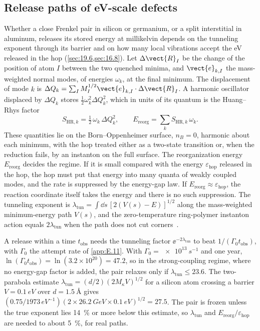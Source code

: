 \subsection{Release paths of eV-scale defects}

Whether a close Frenkel pair in silicon or germanium, or a split interstitial in aluminum, releases its stored energy at millikelvin depends on the tunneling exponent through its barrier and on how many local vibrations accept the eV released in the hop (\cref{sec:19.6,sec:16.8}). Let $\Delta\vect{R}_I$ be the change of the position of atom $I$ between the two quenched minima, and $\vect{e}_{k,I}$ the mass-weighted normal modes, of energies $\omega_k$, at the final minimum. The displacement of mode $k$ is $\Delta Q_k = \sum_I M_I^{1/2}\vect{e}_{k,I}\cdot\Delta\vect{R}_I$. A harmonic oscillator displaced by $\Delta Q_k$ stores $\tfrac12\omega_k^2\Delta Q_k^2$, which in units of its quantum is the Huang--Rhys factor~\cite{huang1950theory}
\begin{equation}
  S_{\mathrm{HR},k} = \tfrac12\,\omega_k\,\Delta Q_k^2 ,
  \qquad E_{\mathrm{reorg}} = \sum_k S_{\mathrm{HR},k}\,\omega_k .
  \label{eq:E.22-SHR}
\end{equation}
These quantities lie on the Born--Oppenheimer surface, $n_B = 0$, harmonic about each minimum, with the hop treated either as a two-state transition or, when the reduction fails, by an instanton on the full surface. The reorganization energy $E_{\mathrm{reorg}}$ decides the regime. If it is small compared with the energy $\varepsilon_{\mathrm{hop}}$ released in the hop, the hop must put that energy into many quanta of weakly coupled modes, and the rate is suppressed by the energy-gap law. If $E_{\mathrm{reorg}} \approx \varepsilon_{\mathrm{hop}}$, the reaction coordinate itself takes the energy and there is no such suppression. The tunneling exponent is $\lambda_{\mathrm{tun}} = \int\dd s\,[2(V(s) - E)]^{1/2}$ along the mass-weighted minimum-energy path $V(s)$, and the zero-temperature ring-polymer instanton action equals $2\lambda_{\mathrm{tun}}$ when the path does not cut corners~\cite{lawrence2024semiclassical}.

A release within a time $t_{\mathrm{obs}}$ needs the tunneling factor $\ee^{-2\lambda_{\mathrm{tun}}}$ to beat $1/(\varGamma_0t_{\mathrm{obs}})$, with $\varGamma_0$ the attempt rate of \cref{app:E.11}. With $\varGamma_0 = \SI{e13}{s^{-1}}$ and one year, $\ln(\varGamma_0t_{\mathrm{obs}}) = \ln(3.2\times10^{20}) = 47.2$, so in the strong-coupling regime, where no energy-gap factor is added, the pair relaxes only if $\lambda_{\mathrm{tun}} \le 23.6$. The two-parabola estimate $\lambda_{\mathrm{tun}} = (d/2)(2M_\kappa V)^{1/2}$ for a silicon atom crossing a barrier $V = \SI{0.1}{eV}$ over $d = \SI{1.5}{\angstrom}$ gives $(0.75/1973\,\si{eV^{-1}})(2\times\SI{26.2}{GeV}\times\SI{0.1}{eV})^{1/2} = 27.5$. The pair is frozen unless the true exponent lies \SI{14}{\percent} or more below this estimate, so $\lambda_{\mathrm{tun}}$ and $E_{\mathrm{reorg}}/\varepsilon_{\mathrm{hop}}$ are needed to about \SI{5}{\percent}, for real paths.

